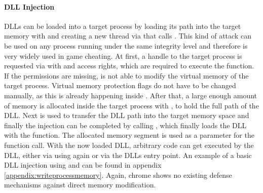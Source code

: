 \paragraph{ DLL Injection}
DLLs can be loaded into a target process by loading its path into the target memory with  and creating a new thread via  that calls . This kind of attack can be used on any process running under the same integrity level and therefore is very widely used in game cheating. At first, a handle to the target process is requested via  with  and  access rights, which are required to execute the  function. If the permissions are missing,  is not able to modify the virtual memory of the target process. Virtual memory protection flags do not have to be changed manually, as this is already happening inside . After that, a large enough amount of memory is allocated inside the target process with , to hold the full path of the DLL. Next  is used to transfer the DLL path into the target memory space and finally the injection can be completed by calling , which finally loads the DLL with the  function. The allocated memory segment is used as a parameter for the  function call. With the now loaded DLL, arbitrary code can get executed by the DLL, either via using  again or via the DLLs entry point.
An example of a basic DLL injection using  and  can be found in appendix \ref{appendix:writeprocessmemory}. Again, chrome shows no existing defense mechanisms against direct memory modification.